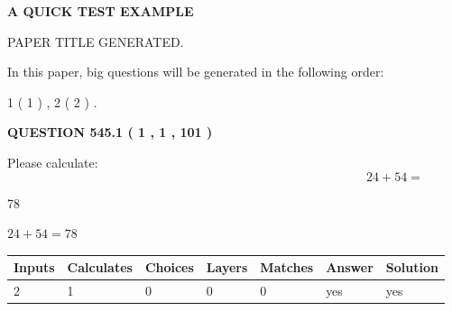 \documentclass[12pt]{article}
\begin{document}
   
 \vspace{0.2in}
{\LARGE {\textbf{ A QUICK TEST EXAMPLE}}}
   
   
 PAPER TITLE GENERATED.
   
   
   
\vspace{0.2in}
   
In this paper, big questions will be generated in the following order: 
   
   
   1 ( 1 )
 ,
   2 ( 2 )
 .
  
\vspace{0.2in}
  
{\textbf{\Large{QUESTION
545.1 
 ( 1 , 1 , 101 )
}}}
  
  
 
Please calculate:
\begin{equation}
24 +  %
54 = \nonumber
\end{equation}
 
 
 
\noindent{}
 
 

78
 
 
\noindent{}
 
 

 
 
 
\noindent{}
 
 

$ %
24 +  %
54=   %
78$
 
 
\noindent{}
 
 

 
   
   
   
   
\noindent\begin{tabular}{|l|l|l|l|l|l|l|}
 \hline
Inputs & Calculates & Choices & Layers & Matches & Answer & Solution \\ \hline
 2  & 
 1  & 
 0
  & 
 0  & 
 0  & 
  yes & 
  yes 
  \\ \hline
 \end{tabular}
   
   
   
   
\noindent{}
   
\end{document}
